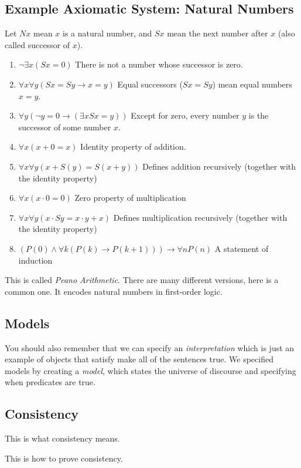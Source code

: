 \documentclass[11pt, letterpaper, twoside, openright]{book}
\begin{document}
\subsection{Example Axiomatic System: Natural Numbers}
Let $Nx$ mean $x$ is a natural number, and $Sx$ mean the next number after $x$ (also called successor of $x$).
\begin{enumerate}
\item $\neg \exists x (Sx = 0)$ There is not a number whose successor is zero.
\item $\forall x \forall y (Sx = Sy \rightarrow x = y)$ Equal successors ($Sx = Sy$) mean equal numbers $x = y$.
\item $\forall y (\neg y = 0 \rightarrow (\exists x Sx = y))$ Except for zero, every number $y$ is the successor of some number $x$.
\item $\forall x (x + 0 = x)$ Identity property of addition.
\item $\forall x \forall y (x + S(y) = S(x + y))$ Defines addition recursively (together with the identity property)
\item $\forall x (x \cdot 0 = 0)$ Zero property of multiplication
\item $\forall x \forall y (x \cdot Sy = x \cdot y + x)$ Defines multiplication recursively (together with the identity property)
\item $(P(0) \wedge \forall k (P(k) \rightarrow P(k + 1))) \rightarrow \forall n P(n)$ A statement of induction
\end{enumerate}

This is called \textit{Peano Arithmetic}. There are many different versions, here is a common one. It encodes natural numbers in first-order logic.

\subsection{Models}
You should also remember that we can specify an \textit{interpretation} which is just an example of objects that satisfy make all of the sentences true. We specified models by creating a \textit{model}, which states the universe of discourse and specifying when predicates are true.

\subsection{Consistency}
This is what consistency means.

This is how to prove consistency.
\end{document}

